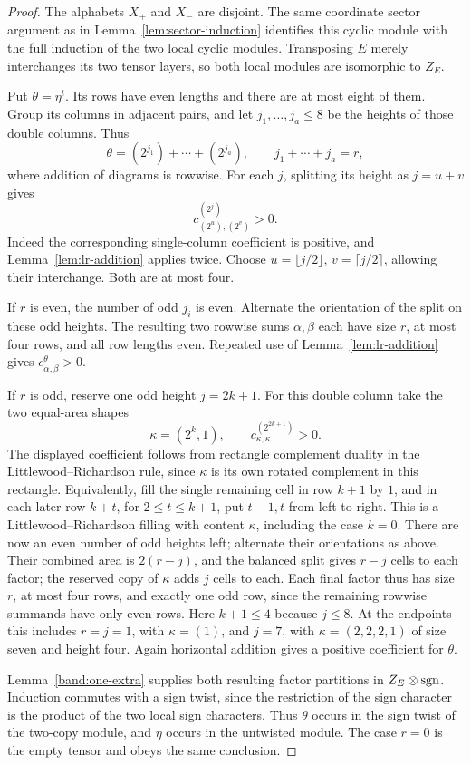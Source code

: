 \begin{proof}
The alphabets $X_+$ and $X_-$ are disjoint.  The same coordinate
sector argument as in Lemma~\ref{lem:sector-induction} identifies
this cyclic module with the full induction of the two local
cyclic modules.  Transposing $E$ merely interchanges its two
tensor layers, so both local modules are isomorphic to $Z_E$.

Put $\theta=\eta^t$.  Its rows have even lengths and
there are at most eight of them.  Group its columns in adjacent
pairs, and let $j_1,\ldots,j_a\le8$ be the heights of those
double columns.  Thus
\[
 \theta=(2^{j_1})+\cdots+(2^{j_a}),\qquad
 j_1+\cdots+j_a=r,
\]
where addition of diagrams is rowwise.
For each $j$, splitting its height as $j=u+v$ gives
\[
 c_{(2^u),(2^v)}^{(2^j)}>0.
\]
Indeed the corresponding single-column coefficient is positive,
and Lemma~\ref{lem:lr-addition} applies twice.
Choose $u=\lfloor j/2\rfloor$, $v=\lceil j/2\rceil$, allowing
their interchange.  Both are at most four.

If $r$ is even, the number of odd $j_i$ is even.  Alternate the
orientation of the split on these odd heights.  The resulting
two rowwise sums $\alpha,\beta$ each have size $r$, at most four
rows, and all row lengths even.  Repeated use of
Lemma~\ref{lem:lr-addition} gives $c_{\alpha,\beta}^{\theta}>0$.

If $r$ is odd, reserve one odd height $j=2k+1$.  For this double
column take the two equal-area shapes
\[
 \kappa=(2^k,1),\qquad
 c_{\kappa,\kappa}^{(2^{2k+1})}>0.
\]
The displayed coefficient follows from rectangle complement
duality in the Littlewood--Richardson rule, since $\kappa$ is
its own rotated complement in this rectangle.  Equivalently,
fill the single remaining cell in row $k+1$ by $1$, and in
each later row $k+t$, for $2\le t\le k+1$, put $t-1,t$ from
left to right.  This is a Littlewood--Richardson filling with
content $\kappa$, including the case $k=0$.
There are now an even number of odd heights left; alternate their
orientations as above.  Their combined area is $2(r-j)$, and
the balanced split gives $r-j$ cells to each factor; the reserved
copy of $\kappa$ adds $j$ cells to each.  Each final factor thus
has size $r$, at most four rows, and exactly one odd row, since
the remaining rowwise summands have only even rows.
Here $k+1\le4$ because $j\le8$.  At the endpoints this includes
$r=j=1$, with $\kappa=(1)$, and $j=7$, with
$\kappa=(2,2,2,1)$ of size seven and height four.
Again horizontal addition gives a positive coefficient for
$\theta$.

Lemma~\ref{band:one-extra} supplies both resulting factor
partitions in $Z_E\otimes\operatorname{sgn}$.  Induction commutes with a sign
twist, since the restriction of the sign character is the product
of the two local sign characters.  Thus $\theta$ occurs in the
sign twist of the two-copy module, and $\eta$ occurs in the
untwisted module.  The case $r=0$ is the empty tensor and obeys
the same conclusion.
\end{proof}

